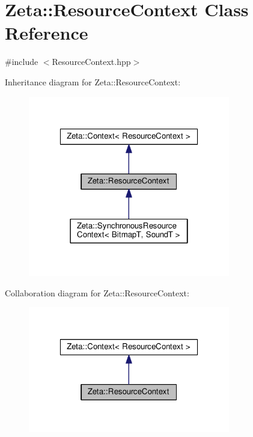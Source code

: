 \hypertarget{classZeta_1_1ResourceContext}{\section{Zeta\+:\+:Resource\+Context Class Reference}
\label{classZeta_1_1ResourceContext}
}


{\ttfamily \#include $<$Resource\+Context.\+hpp$>$}



Inheritance diagram for Zeta\+:\+:Resource\+Context\+:\nopagebreak
\begin{figure}[H]
\begin{center}
\leavevmode
\includegraphics[width=250pt]{classZeta_1_1ResourceContext__inherit__graph}
\end{center}
\end{figure}


Collaboration diagram for Zeta\+:\+:Resource\+Context\+:\nopagebreak
\begin{figure}[H]
\begin{center}
\leavevmode
\includegraphics[width=250pt]{classZeta_1_1ResourceContext__coll__graph}
\end{center}
\end{figure}
